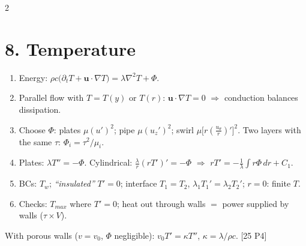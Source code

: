 \documentclass[8pt]{extarticle}
\newcommand{\bu}{\mathbf u}
\newcommand{\pd}{\partial}
\newcommand{\ex}[1]{{\color{ex}\scriptsize[#1]}}
\newcommand{\kw}[1]{{\color{kw}\itshape ``#1''}}
\begin{document}
\begin{multicols*}{2}
\section{8. Temperature}
\begin{enumerate}
\item Energy: $\rho c\big(\pd_tT+\bu\cdot\nabla T\big)=\lambda\nabla^2T+\Phi$.
\item Parallel flow with $T=T(y)$ or $T(r)$: $\bu\cdot\nabla T=0$ $\Rightarrow$ conduction balances dissipation.
\item Choose $\Phi$: plates $\mu(u')^2$; pipe $\mu(u_z')^2$; swirl $\mu\big[r(\frac{u_\theta}{r})'\big]^2$. Two layers with the same $\tau$: $\Phi_i=\tau^2/\mu_i$.
\item Plates: $\lambda T''=-\Phi$. Cylindrical: $\frac\lambda r(rT')'=-\Phi$ $\Rightarrow$ $rT'=-\frac1\lambda\int r\Phi\,dr+C_1$.
\item BCs: $T_w$; \kw{insulated} $T'=0$; interface $T_1=T_2$, $\lambda_1T_1'=\lambda_2T_2'$; $r=0$: finite $T$.
\item Checks: $T_{max}$ where $T'=0$; heat out through walls $=$ power supplied by walls ($\tau\times V$).
\end{enumerate}
With porous walls ($v=v_0$, $\Phi$ negligible): $v_0T'=\kappa T''$, $\kappa=\lambda/\rho c$. \ex{25 P4}


\end{multicols*}
\end{document}
